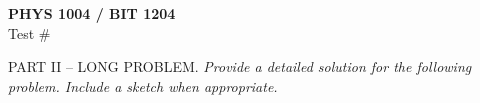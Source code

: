 
\begin{minipage}[t]{0.5\textwidth}
\textbf{PHYS 1004 / BIT 1204}\\
Test \# \testNumber
\end{minipage}

PART II -- LONG PROBLEM. 
\textit{Provide a detailed solution for the following problem.  Include a sketch when appropriate.}
